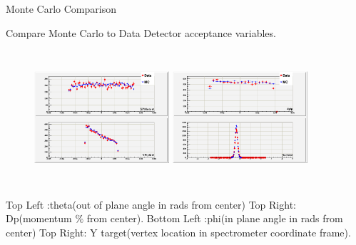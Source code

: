 \documentclass{beamer}
\begin{document}
\begin{frame}{Monte Carlo Comparison}
		\vspace{-22pt}
	\begin{block}{Compare Monte Carlo to Data}
		Detector acceptance variables. 
		\vspace{-12pt}
		\begin{figure}[t]%
			\includegraphics[width=5cm,height=5cm]{../images/xp_yp_tar_1207.png}
			\includegraphics[width=5cm,height=5cm]{../images/dp_ytar_1207.png}
		\end{figure}
		\vspace{-12pt}	
		Top Left :theta(out of plane angle in rads from center)  Top Right: Dp(momentum $\%$ from center).
		Bottom Left :phi(in plane angle in rads from center)  Top Right: Y target(vertex location in spectrometer coordinate frame).
	\end{block}	
\end{frame}
\end{document}
